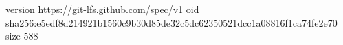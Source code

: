 version https://git-lfs.github.com/spec/v1
oid sha256:e5edf8d214921b1560c9b30d85de32c5dc62350521dcc1a08816f1ca74fe2e70
size 588
